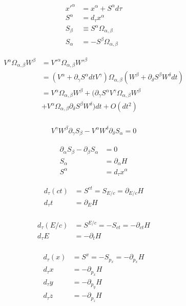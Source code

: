 \documentclass[twocolumn,floatfix,nofootinbib]{revtex4}   %
\theoremstyle{theorem}
\theoremstyle{definition}
\begin{document}
\begin{align*}
x'^{\alpha}&=x^{\alpha} + S^{\alpha} d\tau \\
S^{\alpha} &= d_{\tau}x^{\alpha}  \\
S_{\beta} &\equiv S^{\alpha} \Omega_{\alpha, \beta} \\
S_{\alpha} &= - S^{\beta} \Omega_{\alpha, \beta}
\end{align*}

\begin{align*}
V^{\alpha} \Omega_{\alpha, \beta} W^{\beta} &= V'^{\alpha} \Omega_{\alpha, \beta} W'^{\beta}  \\
&= (V^{\alpha} + \partial_{\gamma} S^{\alpha} dt V^{\gamma}) \Omega_{\alpha, \beta} ( W^{\beta} + \partial_{\delta} S^{\beta} W^{\delta} dt) \\
&= V^{\alpha} \Omega_{\alpha, \beta} W^{\beta} + (\partial_{\gamma} S^{\alpha} V^{\gamma} \Omega_{\alpha, \beta} W^{\beta} \\
 &+ V^{\alpha} \Omega_{\alpha, \beta} \partial_{\delta} S^{\beta} W^{\delta}) dt + O(dt^2) \\
\end{align*}

\begin{align*}
V^{\gamma} W^{\beta} \partial_{\gamma} S_{\beta} - V^{\alpha} W^{\delta} \partial_{\delta} S_{\alpha} = 0
\end{align*}

\begin{align*}
\partial_{\alpha} S_{\beta} - \partial_{\beta} S_{\alpha} &= 0 \\
S_{\alpha} &= \partial_{\alpha}H \\
S^{\alpha} &= d_{\tau}x^{\alpha}
\end{align*}

\begin{align*}
d_{\tau}(ct) &= S^{ct} = S_{E/c} = \partial_{E/c} H \\
d_{\tau}t &= \partial_{E} H \\
\end{align*}

\begin{align*}
d_{\tau}(E/c) &= S^{E/c} = - S_{ct} = - \partial_{ct} H \\
d_{\tau}E &= - \partial_{t} H \\
\end{align*}

\begin{align*}
d_{\tau}(x) &= S^{x} = - S_{p_x} = - \partial_{p_x} H \\
d_{\tau}x &= - \partial_{p_x} H \\
d_{\tau}y &= - \partial_{p_y} H \\
d_{\tau}z &= - \partial_{p_z} H \\
\end{align*}
\end{document}
